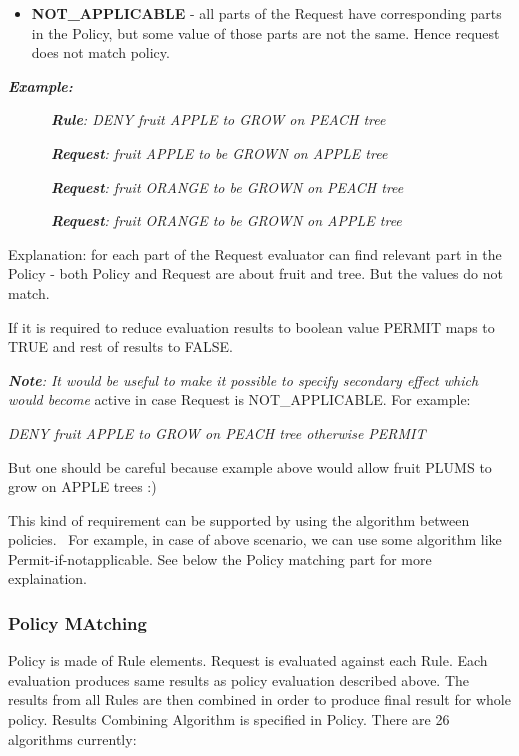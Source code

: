 \documentclass{article}
\newcommand\liststyleWWviiiNumxxi{%
\renewcommand\labelitemi{[F0B7?]}
\renewcommand\labelitemii{o}
\renewcommand\labelitemiii{[F0A7?]}
\renewcommand\labelitemiv{[F0B7?]}
}
\begin{document}
\liststyleWWviiiNumxxi
\begin{itemize}
\item {\color{black}
\textbf{NOT\_APPLICABLE} - all parts of the Request have corresponding
parts in the Policy, but some value of those parts are not the same.
Hence request does not match policy.}
\end{itemize}
{\bfseries\itshape\color{black}
Example:}

{\upshape\color{black}
\textit{\ \ \ \ \ \ }\textbf{\textit{Rule}}\textit{: DENY fruit APPLE to
GROW on PEACH tree}}

{\upshape\color{black}
\textit{\ \ \ \ \ \ }\textbf{\textit{Request}}\textit{: fruit APPLE to
be GROWN on APPLE tree }}

{\upshape\color{black}
\textit{\ \ \ \ \ \ }\textbf{\textit{Request}}\textit{: fruit ORANGE to
be GROWN on PEACH tree }}

{\upshape\color{black}
\textit{\ \ \ \ \ \ }\textbf{\textit{Request}}\textit{: fruit ORANGE to
be GROWN on APPLE tree }}

{\color{black}
Explanation: for each part of the Request evaluator can find relevant
part in the Policy - both Policy and Request are about fruit and tree.
But the values do not match.}

{\color{black}
If it is required to reduce evaluation results to boolean value PERMIT
maps to TRUE and rest of results to FALSE.}

{\upshape\color{black}
\textbf{\textit{Note}}\textit{: It would be useful to make it possible
to specify secondary effect which would become }active in case Request
is NOT\_APPLICABLE. For example:}

{\itshape\color{black}
DENY fruit APPLE to GROW on PEACH tree otherwise PERMIT}

{\color{black}
But one should be careful because example above would allow fruit PLUMS
to grow on APPLE trees :)}

{\color{black}
This kind of requirement can be supported by using the algorithm between
policies. \ For example, in case of above scenario, we can use some
algorithm like {\textquotedbl}Permit-if-notapplicable{\textquotedbl}.
See below the {\textquotedbl}Policy matching{\textquotedbl} part for
more explaination. \ }

\subsubsection{Policy MAtching}
{\upshape\color{black}
Policy is made of Rule elements. Request is evaluated against each Rule.
Each evaluation produces same results as policy evaluation described
above. The results from all Rules are then combined in order to produce
final result for whole policy. Results Combining Algorithm is specified
in Policy. There are 26 algorithms currently:}
\end{document}
